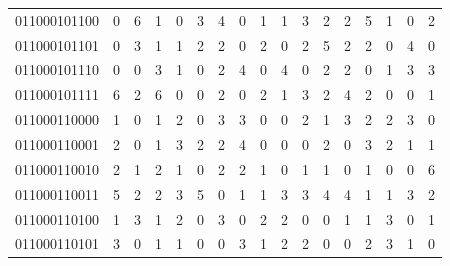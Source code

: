 \documentclass[10pt,a4paper]{article}
\begin{document}
\begin{longtable}{ |c|c|c|c|c|c|c|c|c|c|c|c|c|c|c|c|c| }
    011000101100              & 0                            & 6                                & 1                            & 0                              & 3   & 4   & 0   & 1   & 1   & 3   & 2   & 2   & 5   & 1   & 0   & 2   \\
    011000101101              & 0                            & 3                                & 1                            & 1                              & 2   & 2   & 0   & 2   & 0   & 2   & 5   & 2   & 2   & 0   & 4   & 0   \\
    011000101110              & 0                            & 0                                & 3                            & 1                              & 0   & 2   & 4   & 0   & 4   & 0   & 2   & 2   & 0   & 1   & 3   & 3   \\
    011000101111              & 6                            & 2                                & 6                            & 0                              & 0   & 2   & 0   & 2   & 1   & 3   & 2   & 4   & 2   & 0   & 0   & 1   \\
    011000110000              & 1                            & 0                                & 1                            & 2                              & 0   & 3   & 3   & 0   & 0   & 2   & 1   & 3   & 2   & 2   & 3   & 0   \\
    011000110001              & 2                            & 0                                & 1                            & 3                              & 2   & 2   & 4   & 0   & 0   & 0   & 2   & 0   & 3   & 2   & 1   & 1   \\
    011000110010              & 2                            & 1                                & 2                            & 1                              & 0   & 2   & 2   & 1   & 0   & 1   & 1   & 0   & 1   & 0   & 0   & 6   \\
    011000110011              & 5                            & 2                                & 2                            & 3                              & 5   & 0   & 1   & 1   & 3   & 3   & 4   & 4   & 1   & 1   & 3   & 2   \\
    011000110100              & 1                            & 3                                & 1                            & 2                              & 0   & 3   & 0   & 2   & 2   & 0   & 0   & 1   & 1   & 3   & 0   & 1   \\
    011000110101              & 3                            & 0                                & 1                            & 1                              & 0   & 0   & 3   & 1   & 2   & 2   & 0   & 0   & 2   & 3   & 1   & 0   \\

\end{longtable}
\end{document}
